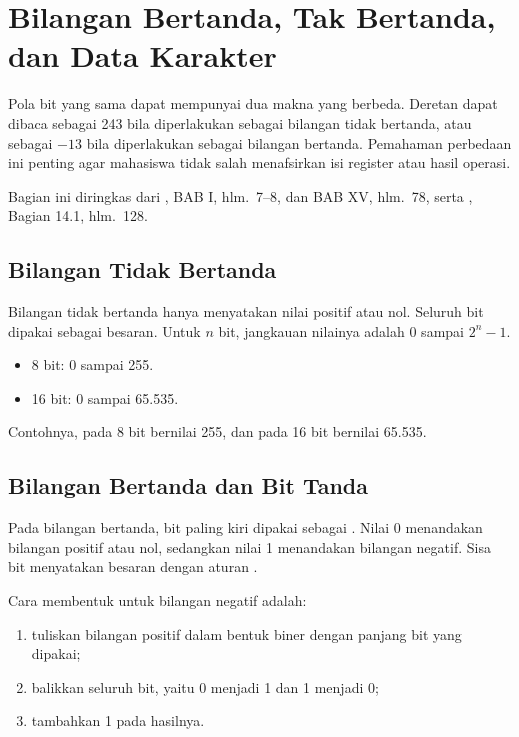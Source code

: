 \section{Bilangan Bertanda, Tak Bertanda, dan Data Karakter}
\label{sec:bilangan-bertanda}

Pola bit yang sama dapat mempunyai dua makna yang berbeda. Deretan
 dapat dibaca sebagai 243 bila diperlakukan sebagai
bilangan tidak bertanda, atau sebagai $-13$ bila diperlakukan sebagai
bilangan bertanda. Pemahaman perbedaan ini penting agar mahasiswa
tidak salah menafsirkan isi register atau hasil operasi.

Bagian ini diringkas dari \cite{sto2001}, BAB I, hlm.~7--8, dan
BAB XV, hlm.~78, serta \cite{gunawan2019}, Bagian 14.1, hlm.~128.

\subsection{Bilangan Tidak Bertanda}

Bilangan tidak bertanda hanya menyatakan nilai positif atau nol.
Seluruh bit dipakai sebagai besaran. Untuk $n$ bit, jangkauan nilainya
adalah 0 sampai $2^n - 1$.

\begin{itemize}
    \item 8 bit: 0 sampai 255.
    \item 16 bit: 0 sampai 65.535.
\end{itemize}

Contohnya,  pada 8 bit bernilai 255, dan  pada
16 bit bernilai 65.535.

\subsection{Bilangan Bertanda dan Bit Tanda}

Pada bilangan bertanda, bit paling kiri dipakai sebagai . Nilai 0 menandakan bilangan positif atau nol, sedangkan nilai
1 menandakan bilangan negatif. Sisa bit menyatakan besaran dengan
aturan .

Cara membentuk  untuk bilangan negatif adalah:

\begin{enumerate}
    \item tuliskan bilangan positif dalam bentuk biner dengan panjang
          bit yang dipakai;
    \item balikkan seluruh bit, yaitu 0 menjadi 1 dan 1 menjadi 0;
    \item tambahkan 1 pada hasilnya.
\end{enumerate}

